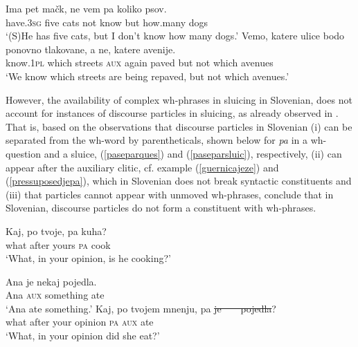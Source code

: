 \documentclass[output=paper,
modfonts,
newtxmath,
hidelinks
]{langscibook}
\begin{document}
\begin{exe}
\ex \begin{xlist}
\ex \gll Ima pet mačk, ne vem pa koliko psov.\\
have.\textsc{3sg} five cats not know but how.many dogs\\
\trans `(S)He has five cats, but I don't know how many dogs.'
\ex \gll	Vemo, katere ulice bodo ponovno tlakovane, a ne, katere avenije. \\
		know.\textsc{1pl} which streets \textsc{aux} 	again paved but not which avenues \\
\trans `We know which streets are being repaved, but not which avenues.'
\end{xlist}\end{exe}

\noindent However, the availability of complex wh-phrases in sluicing in Slovenian, does not account for instances of discourse particles in sluicing, as already observed in \cite{marusicetal2015}. That is, based on the observations that discourse particles in Slovenian (i) can be separated from the wh-word by parentheticals, shown below for \textit{pa} in a wh-question and a sluice, (\ref{paseparques}) and (\ref{paseparsluic}), respectively, (ii) can appear after the auxiliary clitic, cf. example (\ref{guernicajeze}) and (\ref{pressuposedjepa}), which in Slovenian does not break syntactic constituents and (iii) that particles cannot appear with unmoved wh-phrases, \cite{marusicetal2015} conclude that in Slovenian, discourse particles do not form a constituent with wh-phrases. 

\begin{exe}
\ex \label{paseparques}
\gll Kaj, po tvoje, pa kuha?\\
	what after yours \textsc{pa} cook\\
\trans  `What, in your opinion, is he cooking?'
\ex \begin{xlist}
\ex \label{paseparsluic}
\gll 	Ana je nekaj pojedla. \\
 		Ana \textsc{aux} something ate\\
 \trans  `Ana ate something.'
\ex \gll Kaj, po tvojem mnenju, pa \sout{je}\sout{\ }\sout{\ }\sout{\ }\sout{\ }\sout{pojedla}?\\
 		what after your opinion \textsc{pa} {\textsc{aux} ate}\\
\trans `What, in your opinion did she eat?'
\end{xlist}\end{exe}
 
\end{document}
